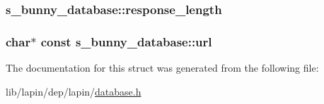 \hypertarget{structs__bunny__database_ae68f626d46bc584f706199401e8e8c8e}{
\subsubsection[{response\-\_\-length}]{ s\-\_\-bunny\-\_\-database\-::response\-\_\-length}}\label{structs__bunny__database_ae68f626d46bc584f706199401e8e8c8e}
\hypertarget{structs__bunny__database_ae7dfeb8304165616b036f37ef5a96e1b}{
\subsubsection[{url}]{ char$\ast$ {\bf const} s\-\_\-bunny\-\_\-database\-::url}}\label{structs__bunny__database_ae7dfeb8304165616b036f37ef5a96e1b}


The documentation for this struct was generated from the following file\-:\begin{DoxyCompactItemize}
\item 
lib/lapin/dep/lapin/\hyperlink{database_8h}{database.\-h}\end{DoxyCompactItemize}
